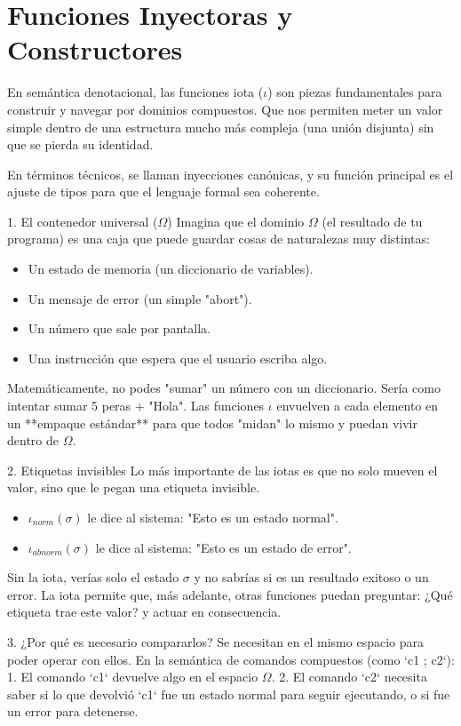 \documentclass[a4paper,11pt]{article}
\begin{document}
\section{Funciones Inyectoras y Constructores}
En semántica denotacional, las funciones iota ($\iota$) son piezas fundamentales para construir y navegar por dominios compuestos. Que nos permiten meter un valor simple dentro de una estructura mucho más compleja (una unión disjunta) sin que se pierda su identidad.

En términos técnicos, se llaman inyecciones canónicas, y su función principal es el ajuste de tipos para que el lenguaje formal sea coherente.

1. El contenedor universal ($\Omega$)
Imagina que el dominio $\Omega$ (el resultado de tu programa) es una caja que puede guardar cosas de naturalezas muy distintas:
\begin{itemize}
    \item Un estado de memoria (un diccionario de variables).
    \item Un mensaje de error (un simple "abort").
    \item Un número que sale por pantalla.
    \item Una instrucción que espera que el usuario escriba algo.
\end{itemize}

Matemáticamente, no podes "sumar" un número con un diccionario. Sería como intentar sumar 5 peras + "Hola". Las funciones $\iota$ envuelven a cada elemento en un **empaque estándar** para que todos "midan" lo mismo y puedan vivir dentro de $\Omega$.

2. Etiquetas invisibles
Lo más importante de las iotas es que no solo mueven el valor, sino que le pegan una etiqueta invisible. 
\begin{itemize}
    \item $\iota_{norm}(\sigma)$ le dice al sistema: "Esto es un estado normal".
    \item $\iota_{abnorm}(\sigma)$ le dice al sistema: "Esto es un estado de error".
\end{itemize}

Sin la iota, verías solo el estado $\sigma$ y no sabrías si es un resultado exitoso o un error. La iota permite que, más adelante, otras funciones puedan preguntar: ¿Qué etiqueta trae este valor? y actuar en consecuencia.

3. ¿Por qué es necesario compararlos?
Se necesitan en el mismo espacio para poder operar con ellos. En la semántica de comandos compuestos (como `c1 ; c2`):
1.  El comando `c1` devuelve algo en el espacio $\Omega$.
2.  El comando `c2` necesita saber si lo que devolvió `c1` fue un estado normal para seguir ejecutando, o si fue un error para detenerse.
\end{document}
